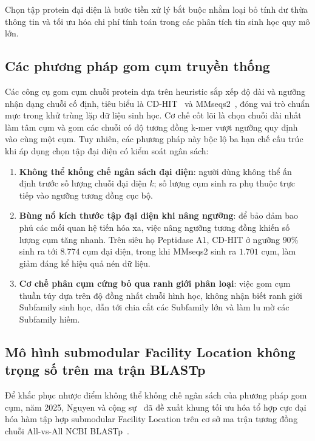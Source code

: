 Chọn tập protein đại diện là bước tiền xử lý bắt buộc nhằm loại bỏ tính dư thừa thông tin và tối ưu hóa chi phí tính toán trong các phân tích tin sinh học quy mô lớn.

\subsection{Các phương pháp gom cụm truyền thống}
\label{subsec:traditional_clustering}

Các công cụ gom cụm chuỗi protein dựa trên heuristic sắp xếp độ dài và ngưỡng nhận dạng chuỗi cố định, tiêu biểu là CD-HIT~\cite{cdhit} và MMseqs2~\cite{mmseqs2}, đóng vai trò chuẩn mực trong khử trùng lặp dữ liệu sinh học. Cơ chế cốt lõi là chọn chuỗi dài nhất làm tâm cụm và gom các chuỗi có độ tương đồng k-mer vượt ngưỡng quy định vào cùng một cụm. Tuy nhiên, các phương pháp này bộc lộ ba hạn chế cấu trúc khi áp dụng chọn tập đại diện có kiểm soát ngân sách:
\begin{enumerate}
    \item \textbf{Không thể khống chế ngân sách đại diện}: người dùng không thể ấn định trước số lượng chuỗi đại diện $k$; số lượng cụm sinh ra phụ thuộc trực tiếp vào ngưỡng tương đồng cục bộ.
    \item \textbf{Bùng nổ kích thước tập đại diện khi nâng ngưỡng}: để bảo đảm bao phủ các mối quan hệ tiến hóa xa, việc nâng ngưỡng tương đồng khiến số lượng cụm tăng nhanh. Trên siêu họ Peptidase A1, CD-HIT ở ngưỡng $90\%$ sinh ra tới $8.774$ cụm đại diện, trong khi MMseqs2 sinh ra $1.701$ cụm, làm giảm đáng kể hiệu quả nén dữ liệu.
    \item \textbf{Cơ chế phân cụm cứng bỏ qua ranh giới phân loại}: việc gom cụm thuần túy dựa trên độ đồng nhất chuỗi hình học, không nhận biết ranh giới Subfamily sinh học, dẫn tới chia cắt các Subfamily lớn và làm lu mờ các Subfamily hiếm.
\end{enumerate}

\subsection{Mô hình submodular Facility Location không trọng số trên ma trận BLASTp}
\label{subsec:baseline_model}

Để khắc phục nhược điểm không thể khống chế ngân sách của phương pháp gom cụm, năm 2025, Nguyen và cộng sự~\cite{nguyen2025} đã đề xuất khung tối ưu hóa tổ hợp cực đại hóa hàm tập hợp submodular Facility Location trên cơ sở ma trận tương đồng chuỗi All-vs-All NCBI BLASTp~\cite{blast}.

